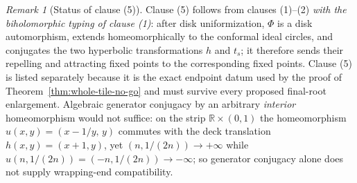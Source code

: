 \documentclass[11pt,reqno]{amsart}
\theoremstyle{definition}
\theoremstyle{remark}
\newtheorem{remark}[theorem]{Remark}
\begin{document}
\begin{remark}[Status of clause (5)]\label{rem:clause5}
Clause (5) follows from clauses (1)--(2) \emph{with the biholomorphic typing of clause (1)}: after disk uniformization, \(\Phi\) is a disk automorphism, extends homeomorphically to the conformal ideal circles, and conjugates the two hyperbolic transformations \(h\) and \(t_s\); it therefore sends their repelling and attracting fixed points to the corresponding fixed points.  Clause (5) is listed separately because it is the exact endpoint datum used by the proof of Theorem~\ref{thm:whole-tile-no-go} and must survive every proposed final-root enlargement.  Algebraic generator conjugacy by an arbitrary \emph{interior} homeomorphism would not suffice: on the strip \(\mathbb R\times(0,1)\) the homeomorphism \(u(x,y)=(x-1/y,\,y)\) commutes with the deck translation \(h(x,y)=(x+1,y)\), yet \((n,1/(2n))\to+\infty\) while \(u(n,1/(2n))=(-n,1/(2n))\to-\infty\); so generator conjugacy alone does not supply wrapping-end compatibility.
\end{remark}
\end{document}
